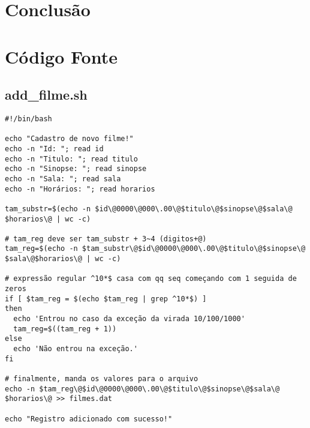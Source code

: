 \documentclass[11pt,twoside]{article}
\begin{document}
\section{Conclusão}


\section{Código Fonte}

\subsection{add\_filme.sh}  %
\begin{verbatim}
#!/bin/bash

echo "Cadastro de novo filme!"
echo -n "Id: "; read id
echo -n "Titulo: "; read titulo
echo -n "Sinopse: "; read sinopse
echo -n "Sala: "; read sala
echo -n "Horários: "; read horarios

tam_substr=$(echo -n $id\@0000\@000\.00\@$titulo\@$sinopse\@$sala\@
$horarios\@ | wc -c)

# tam_reg deve ser tam_substr + 3~4 (digitos+@)
tam_reg=$(echo -n $tam_substr\@$id\@0000\@000\.00\@$titulo\@$sinopse\@
$sala\@$horarios\@ | wc -c)

# expressão regular ^10*$ casa com qq seq começando com 1 seguida de zeros
if [ $tam_reg = $(echo $tam_reg | grep ^10*$) ]
then
  echo 'Entrou no caso da exceção da virada 10/100/1000'
  tam_reg=$((tam_reg + 1))
else
  echo 'Não entrou na exceção.'
fi

# finalmente, manda os valores para o arquivo
echo -n $tam_reg\@$id\@0000\@000\.00\@$titulo\@$sinopse\@$sala\@
$horarios\@ >> filmes.dat

echo "Registro adicionado com sucesso!"
\end{verbatim}


\end{document}
